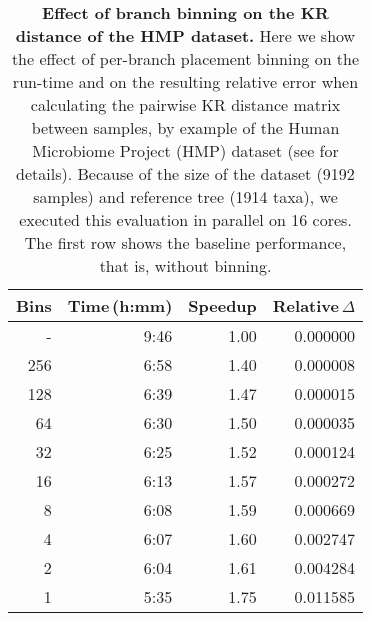 \begin{table}[htb]
\caption[Effect of branch binning on the KR distance of the HMP dataset]{
    \textbf{Effect of branch binning on the KR distance of the HMP dataset.}
    Here we show the effect of per-branch placement binning
    on the run-time and on the resulting relative error when calculating the pairwise KR distance matrix between samples,
    by example of the Human Microbiome Project (HMP) \cite{Huttenhower2012,Methe2012} dataset
    (see  for details).
    Because of the size of the dataset (\num{9192} samples) and reference tree (\num{1914} taxa),
    we executed this evaluation in parallel on \num{16} cores.
    The first row shows the baseline performance, that is, without binning.
}
\label{tab:hmp_binning_error}
{
    \begin{center}
    \begin{tabular}{rrrr}
        \toprule
        Bins    &  Time\,(h:mm) &  Speedup  &  Relative\,$\Delta$ \\
        \midrule
        -     & 9:46   & 1.00   & 0.000000 \\
        256   & 6:58   & 1.40   & 0.000008 \\
        128   & 6:39   & 1.47   & 0.000015 \\
        64    & 6:30   & 1.50   & 0.000035 \\
        32    & 6:25   & 1.52   & 0.000124 \\
        16    & 6:13   & 1.57   & 0.000272 \\
        8     & 6:08   & 1.59   & 0.000669 \\
        4     & 6:07   & 1.60   & 0.002747 \\
        2     & 6:04   & 1.61   & 0.004284 \\
        1     & 5:35   & 1.75   & 0.011585 \\
        \bottomrule
    \end{tabular}
    \end{center}
}
\end{table}

